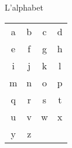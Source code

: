 \begin{frame}{L'alphabet }
  \begin{center}
    \LARGE
    \begin{tabular}{c c c c}
      a & b & c & d \\
      e & f & g & h \\
      i & j & k & l \\
      m & n & o & p \\
      q & r & s & t \\
      u & v & w & x \\
      y & z &   & \\
    \end{tabular}
  \end{center}
\end{frame}